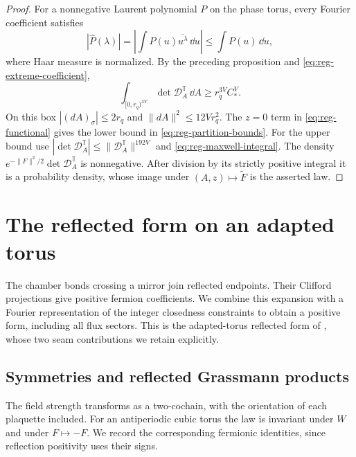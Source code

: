 \begin{proof}
For a nonnegative Laurent polynomial $P$ on the phase torus, every
Fourier coefficient satisfies
\[
 |\widehat P(\lambda)|
 =\left|\int P(u)\overline{u^\lambda}\,\dd u\right|
 \le\int P(u)\,\dd u,
\]
where Haar measure is normalized. By the preceding proposition and
\eqref{eq:reg-extreme-coefficient},
\[
 \int_{[0,r_q)^{3V}}\det \mathcal D_A^{\mathbb T}\,\dd A
 \ge r_q^{3V}C_*^V.
\]
On this box $|(dA)_\sigma|\le2r_q$ and
$\|dA\|^2\le12Vr_q^2$. The $z=0$ term in
\eqref{eq:reg-functional} gives the lower bound in
\eqref{eq:reg-partition-bounds}. For the upper bound use
$|\det \mathcal D_A^{\mathbb T}|\le\|\mathcal D_A^{\mathbb T}\|^{192V}$ and
\eqref{eq:reg-maxwell-integral}. The density
$e^{-\|F\|^2/2}\det \mathcal D_A^{\mathbb T}$ is nonnegative. After division
by its strictly positive integral it is a probability density, whose
image under $(A,z)\mapsto\widetilde F$ is the asserted law.
\end{proof}

\section{The reflected form on an adapted torus}\label{sec:finite-reflection}

The chamber bonds crossing a mirror join reflected endpoints. Their
Clifford projections give positive fermion coefficients. We combine
this expansion with a Fourier representation of the integer closedness
constraints to obtain a positive form, including all flux sectors.
This is the adapted-torus reflected form of
\cite[Sections~3.6--3.7]{ChamberQED}, whose two seam contributions
we retain explicitly.

\subsection{Symmetries and reflected Grassmann products}
\label{subsec:reg-symmetries}

The field strength transforms as a two-cochain, with the orientation
of each plaquette included. For an antiperiodic cubic torus the law is invariant
under $W$ and under $F\mapsto-F$. We record the corresponding
fermionic identities, since reflection positivity uses their signs.

